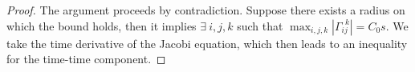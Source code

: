 \documentclass[pdflatex,sn-mathphys-num]{sn-jnl}
\theoremstyle{definition}
\begin{document}
\begin{proof}
The argument proceeds by contradiction. Suppose there exists a radius on which the bound holds, then it implies $\exists ~i, j, k$ such that $\max_{i,j,k}|\Gamma_{i j}^{~~k}| = C_0s$. We take the time derivative of the Jacobi equation, which then leads to an inequality for the time-time component.

\end{proof}
\end{document}
